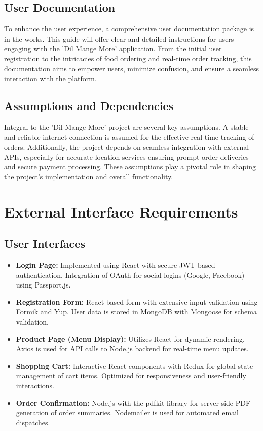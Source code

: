 \documentclass{article}
\begin{document}
\subsection{User Documentation}
To enhance the user experience, a comprehensive user documentation package is in the works. This guide will offer clear and detailed instructions for users engaging with the 'Dil Mange More' application. From the initial user registration to the intricacies of food ordering and real-time order tracking, this documentation aims to empower users, minimize confusion, and ensure a seamless interaction with the platform.

\subsection{Assumptions and Dependencies}
Integral to the 'Dil Mange More' project are several key assumptions. A stable and reliable internet connection is assumed for the effective real-time tracking of orders. Additionally, the project depends on seamless integration with external APIs, especially for accurate location services ensuring prompt order deliveries and secure payment processing. These assumptions play a pivotal role in shaping the project's implementation and overall functionality.


\newpage
\newpage
\section{External Interface Requirements}
\subsection{User Interfaces}
\begin{itemize}
    \item \textbf{Login Page:} Implemented using React with secure JWT-based authentication. Integration of OAuth for social logins (Google, Facebook) using Passport.js.
    \item \textbf{Registration Form:} React-based form with extensive input validation using Formik and Yup. User data is stored in MongoDB with Mongoose for schema validation.
    \item \textbf{Product Page (Menu Display):} Utilizes React for dynamic rendering. Axios is used for API calls to Node.js backend for real-time menu updates.
    \item \textbf{Shopping Cart:} Interactive React components with Redux for global state management of cart items. Optimized for responsiveness and user-friendly interactions.
    \item \textbf{Order Confirmation:} Node.js with the pdfkit library for server-side PDF generation of order summaries. Nodemailer is used for automated email dispatches.
\end{itemize}
\end{document}
